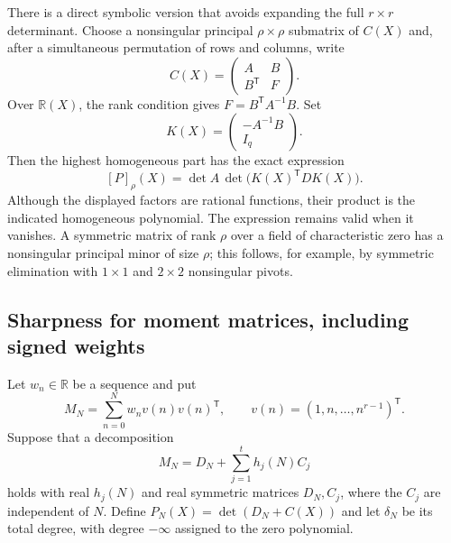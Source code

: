 \documentclass[11pt]{article}
\theoremstyle{definition}
\theoremstyle{remark}
\numberwithin{equation}{section}
\begin{document}
There is a direct symbolic version that avoids expanding the full
$r\times r$ determinant.  Choose a nonsingular principal
$\rho\times\rho$ submatrix of $C(X)$ and, after a simultaneous
permutation of rows and columns, write
\[
 C(X)=\begin{pmatrix} A&B\\B^{\mathsf T}&F\end{pmatrix}.
\]
Over $\mathbb R(X)$, the rank condition gives $F=B^{\mathsf T}A^{-1}B$.
Set
\begin{equation}\label{deg:generic-kernel}
 K(X)=\begin{pmatrix}-A^{-1}B\\I_q\end{pmatrix}.
\end{equation}
Then the highest homogeneous part has the exact expression
\begin{equation}\label{deg:highest}
 [P]_{\rho}(X)=\det A\,
                  \det\bigl(K(X)^{\mathsf T}DK(X)\bigr).
\end{equation}
Although the displayed factors are rational functions, their product is
the indicated homogeneous polynomial.  The expression remains valid
when it vanishes.  A symmetric matrix of rank $\rho$ over a field of
characteristic zero has a nonsingular principal minor of size $\rho$;
this follows, for example, by symmetric elimination with $1\times1$
and $2\times2$ nonsingular pivots.

\subsection{Sharpness for moment matrices, including signed weights}

Let $w_n\in\mathbb R$ be a sequence and put
\begin{equation}\label{deg:moment}
 M_N=\sum_{n=0}^N w_n v(n)v(n)^{\mathsf T},
 \qquad v(n)=(1,n,\ldots,n^{r-1})^{\mathsf T}.
\end{equation}
Suppose that a decomposition
\begin{equation}\label{deg:decomp}
 M_N=D_N+\sum_{j=1}^t h_j(N)C_j
\end{equation}
holds with real $h_j(N)$ and real symmetric matrices $D_N,C_j$,
where the $C_j$ are independent of $N$.  Define
$P_N(X)=\det(D_N+C(X))$ and let $\delta_N$ be its total degree,
with degree $-\infty$ assigned to the zero polynomial.
\end{document}
